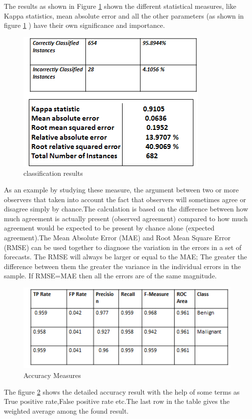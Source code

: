 \documentclass[conference]{IEEEtran}
\begin{document}
 The results as shown in Figure \ref{fig_class} shown the  different statistical measures, like Kappa statistics, mean absolute error and all the other parameters (as shown in figure \ref{fig_class} ) have their own significance and importance.

\begin{figure}[!h]
\centering
\includegraphics[scale=0.7]{classification}
\caption{classification results}
\label{fig_class}
\end{figure}

As an example by studying these measure, the argument between two or more observers that taken into account the fact that observers will sometimes agree or disagree simply by chance.The calculation is based on the difference between how much agreement is actually present (observed agreement) compared to how much agreement would be expected to be  present by chance alone (expected agreement).The Mean Absolute Error (MAE) and Root Mean Square Error (RMSE) can be used together to diagnose the variation in the errors in a set of forecasts. The RMSE will always be larger or equal to the MAE; The greater the difference between them  the greater the variance in the individual errors in the sample. If RMSE=MAE then all the errors are of the same magnitude.

\begin{figure}[!h]
\centering
\includegraphics[scale=0.7]{accuracy}
\caption{Accuracy Measures}
\label{fig_accuracy}
\end{figure}
The figure \ref{fig_accuracy} shows the detailed accuracy result with the help of some terms as True positive rate,False positive rate etc.The last row in the table gives the weighted average among the found result. 
\end{document}
